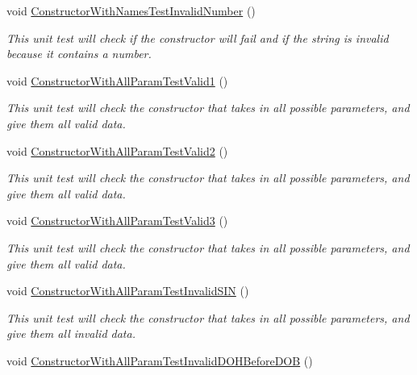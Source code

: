 \begin{DoxyCompactItemize}
void \hyperlink{class_my_all_employee_1_1_tests_1_1_full_time_employee_tests_aeb693bf7d723b3093207cd16dfe67922}{Constructor\+With\+Names\+Test\+Invalid\+Number} ()
\begin{DoxyCompactList}\small\item\em This unit test will check if the constructor will fail and if the string is invalid because it contains a number. \end{DoxyCompactList}\item 
void \hyperlink{class_my_all_employee_1_1_tests_1_1_full_time_employee_tests_ad46719ac401ed4233b120609fa057374}{Constructor\+With\+All\+Param\+Test\+Valid1} ()
\begin{DoxyCompactList}\small\item\em This unit test will check the constructor that takes in all possible parameters, and give them all valid data. \end{DoxyCompactList}\item 
void \hyperlink{class_my_all_employee_1_1_tests_1_1_full_time_employee_tests_a3fe215b36ca6d6928beeb8fe9b86d706}{Constructor\+With\+All\+Param\+Test\+Valid2} ()
\begin{DoxyCompactList}\small\item\em This unit test will check the constructor that takes in all possible parameters, and give them all valid data. \end{DoxyCompactList}\item 
void \hyperlink{class_my_all_employee_1_1_tests_1_1_full_time_employee_tests_af5a3ab06211fa668ac9a00cc160961be}{Constructor\+With\+All\+Param\+Test\+Valid3} ()
\begin{DoxyCompactList}\small\item\em This unit test will check the constructor that takes in all possible parameters, and give them all valid data. \end{DoxyCompactList}\item 
void \hyperlink{class_my_all_employee_1_1_tests_1_1_full_time_employee_tests_af5d09cc6cc90ec01183f059f12ef04f7}{Constructor\+With\+All\+Param\+Test\+Invalid\+S\+I\+N} ()
\begin{DoxyCompactList}\small\item\em This unit test will check the constructor that takes in all possible parameters, and give them all invalid data. \end{DoxyCompactList}\item 
void \hyperlink{class_my_all_employee_1_1_tests_1_1_full_time_employee_tests_a49b3d396694536945d39f2f56c8e2ffc}{Constructor\+With\+All\+Param\+Test\+Invalid\+D\+O\+H\+Before\+D\+O\+B} ()

\end{DoxyCompactItemize}
